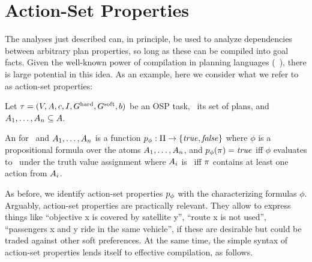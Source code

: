 \section{Action-Set Properties}
\label{actionsetprops}



The analyses just described can, in principle, be used to analyze
dependencies between arbitrary plan properties, so long as these can
be compiled into goal facts. Given the well-known power of compilation
in planning languages
(\eg\ \cite{gazen:knoblock:ecp-97,nebel:jair-00,edelkamp:icaps-06,palacios:geffner:jair-09,baier:etal:ai-09}),
there is large potential in this idea. As an example, here we consider
what we refer to as action-set properties:

%
\begin{definition}\label{def:action-set-properties}
Let $\tau =
(V,\allowbreak A,\allowbreak{\ensuremath{c}},\allowbreak I,\allowbreak G^{\text{\textup{hard}}},\allowbreak G^{\text{\textup{soft}}},\allowbreak{\ensuremath{b}})$
be an OSP task, \plans\ its set of plans, and $A_1, \dots, A_n
\subseteq A$.

An  for \task\ and $A_1, \dots,
A_n$ is a function $p_\phi : \Pi \to \{\mathit{true}, \mathit{false}\}$
where $\phi$ is a propositional formula over the atoms $A_1,
\dots, A_n$, and $p_\phi(\pi) = \mathit{true}$ iff $\phi$ evaluates
to \true\ under the truth value assignment where $A_i$ is
\true\ iff $\pi$ contains at least one action from $A_i$.
\end{definition}

As before, we identify action-set properties $p_\phi$ with the
characterizing formulas $\phi$. Arguably, action-set properties are
practically relevant. They allow to express things like ``objective x
is covered by satellite y'', %
%
``route x is not used'',
%
``passengers x and y ride in the same vehicle'',
%
if these are desirable but could be traded against other soft
preferences. At the same time, the simple syntax of action-set
properties lends itself to effective compilation, as follows.

